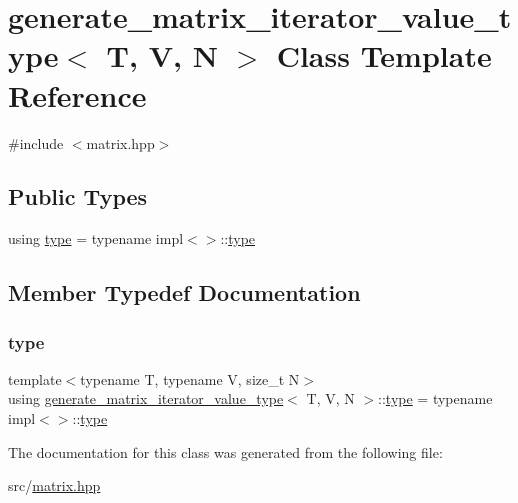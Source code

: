 \hypertarget{classgenerate__matrix__iterator__value__type}{}\section{generate\+\_\+matrix\+\_\+iterator\+\_\+value\+\_\+type$<$ T, V, N $>$ Class Template Reference}
\label{classgenerate__matrix__iterator__value__type}


{\ttfamily \#include $<$matrix.\+hpp$>$}

\subsection*{Public Types}
\begin{DoxyCompactItemize}
\item 
using \hyperlink{classgenerate__matrix__iterator__value__type_af6a26babe1fdced9b043434c69bbe0eb}{type} = typename impl$<$$>$\+::\hyperlink{classgenerate__matrix__iterator__value__type_af6a26babe1fdced9b043434c69bbe0eb}{type}
\end{DoxyCompactItemize}


\subsection{Member Typedef Documentation}
\mbox{\label{classgenerate__matrix__iterator__value__type_af6a26babe1fdced9b043434c69bbe0eb}} 
\subsubsection{\texorpdfstring{type}{type}}
{\footnotesize\ttfamily template$<$typename T, typename V, size\+\_\+t N$>$ \\
using \hyperlink{classgenerate__matrix__iterator__value__type}{generate\+\_\+matrix\+\_\+iterator\+\_\+value\+\_\+type}$<$ T, V, N $>$\+::\hyperlink{classgenerate__matrix__iterator__value__type_af6a26babe1fdced9b043434c69bbe0eb}{type} =  typename impl$<$$>$\+::\hyperlink{classgenerate__matrix__iterator__value__type_af6a26babe1fdced9b043434c69bbe0eb}{type}}



The documentation for this class was generated from the following file\+:\begin{DoxyCompactItemize}
\item 
src/\hyperlink{matrix_8hpp}{matrix.\+hpp}\end{DoxyCompactItemize}
